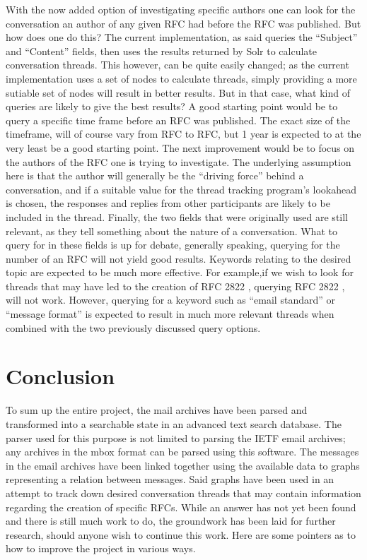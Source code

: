 \documentclass[a4paper,english]{report}
\begin{document}
With the now added option of investigating specific authors one can look for the conversation an author of any given RFC had before the RFC was published. But how does one do this? The current implementation, as said queries the “Subject” and “Content” fields, then uses the results returned by Solr to calculate conversation threads. This however, can be quite easily changed; as the current implementation uses a set of nodes to calculate threads, simply providing a more sutiable set of nodes will result in better results. But in that case, what kind of queries are likely to give the best results?
A good starting point would be to query a specific time frame before an RFC was published. The exact size of the timeframe, will of course vary from RFC to RFC, but 1 year is expected to at the very least be a good starting point. The next improvement would be to focus on the authors of the RFC one is trying to investigate. The underlying assumption here is that the author will generally be the “driving force” behind a conversation, and if a suitable value for the thread tracking program's lookahead is chosen, the responses and replies from other participants are likely to be included in the thread.
Finally, the two fields that were originally used are still relevant, as they tell something about the nature of a conversation. What to query for in these fields is up for debate, generally speaking, querying for the number of an RFC will not yield good results. Keywords relating to the desired topic are expected to be much more effective. 
For example,if we wish to look for threads that may have led to the creation of RFC 2822 \cite{RFC2822}, querying RFC 2822 \cite{RFC2822}, will not work. However, querying for a keyword such as “email standard” or “message format” is expected to result in much more relevant threads when combined with the two previously discussed query options.




\chapter{Conclusion}

To sum up the entire project, the mail archives have been parsed and transformed into a searchable state in an advanced text search database. The parser used for this purpose is not limited to parsing the IETF email archives; any archives in the mbox format can be parsed using this software.
The messages in the email archives have been linked together using the available data to graphs representing a relation between messages. Said graphs have been used in an attempt to track down desired conversation threads that may contain information regarding the creation of specific RFCs. While an answer has not yet been found and there is still much work to do, the groundwork has been laid for further research, should anyone wish to continue this work. Here are some pointers as to how to improve the project in various ways.
\end{document}
